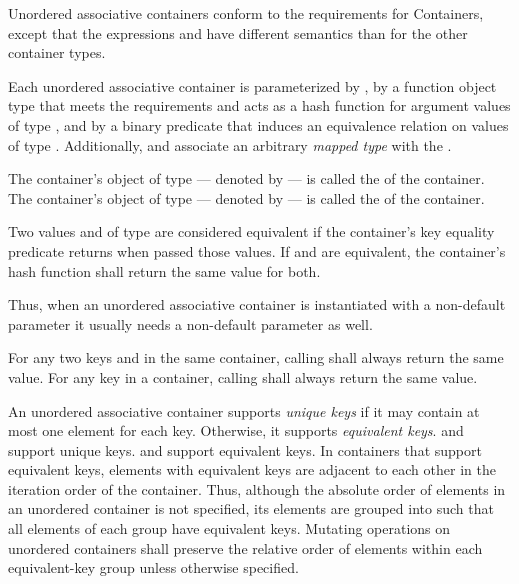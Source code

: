 \pnum
{}%
%
%
Unordered associative containers conform to the requirements for
Containers, except that
the expressions
 and  have different semantics than for the other
container types.

\pnum
Each unordered associative container is parameterized by ,
by a function object type  that meets the 
requirements and acts as a hash function for
argument values of type , and by a binary predicate 
that induces an equivalence relation on values of type .
Additionally,  and  associate
an arbitrary \textit{mapped type}  with the .

\pnum
{}%
%
The container's object of type  --- denoted by
 --- is called the  of the
container. The container's object of type  ---
denoted by  --- is called the
 of the container.

\pnum
{}%
Two values  and  of type  are
considered equivalent if the container's
key equality predicate returns
 when passed those values.  If  and
 are equivalent, the container's hash function shall
return the same value for both.
\begin{note} Thus, when an unordered associative container is instantiated with
a non-default  parameter it usually needs a non-default 
parameter as well. \end{note}
For any two keys  and  in the same container,
calling  shall always return the same value.
For any key  in a container, calling 
shall always return the same value.

\pnum
{}%
%
An unordered associative container supports \textit{unique keys} if it
may contain at most one element for each key.  Otherwise, it supports
\textit{equivalent keys}.   and 
support unique keys.  and 
support equivalent keys.  In containers that support equivalent keys,
elements with equivalent keys are adjacent to each other
in the iteration order of the container. Thus, although the absolute order
of elements in an unordered container is not specified, its elements are
grouped into  such that all elements of each
group have equivalent keys. Mutating operations on unordered containers shall
preserve the relative order of elements within each equivalent-key group
unless otherwise specified.

